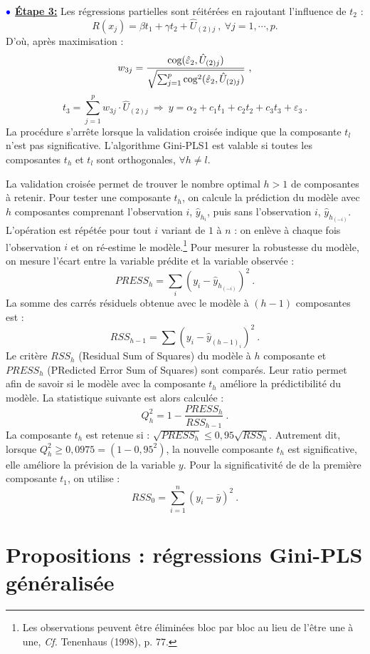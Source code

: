 $\bulle$ \underline{\textbf{Étape 3:}} Les régressions partielles sont réitérées en rajoutant l'influence de $t_2$ :
\[
R(x_j) = \beta t_1 + \gamma t_2 + \hat{U}_{(2)j} \ , \ \forall j = 1,\cdots, p.
\]
D'où, après maximisation :
\[
w_{3j} = \frac{\text{cog}(\hat{\varepsilon}_2,\hat{U}_{(2)j})}{\sqrt{\sum_{j=1}^p \text{cog}^2(\hat{\varepsilon}_2,\hat{U}_{(2)j})}} \ ,
\]
\[
t_3 = \sum_{j=1}^p w_{3j}\cdot \hat{U}_{(2)j} \ \Longrightarrow \ y = \alpha_2 + c_1 t_1 + c_2 t_2 + c_3 t_3 + \varepsilon_3 \ .
\]
La procédure s'arrête lorsque la validation croisée indique que la composante $t_l$ n'est pas significative. L'algorithme Gini-PLS1 est valable si toutes les composantes $t_h$ et $t_l$ sont orthogonales, $\forall h\neq l$. 

\medskip

La validation croisée permet de trouver le nombre optimal $h>1$ de composantes à retenir. Pour tester une composante $t_h$, on calcule la prédiction du modèle avec $h$ composantes comprenant l'observation $i$, $\hat{y}_{h_i}$, puis sans l'observation $i$, $\hat{y}_{h_{(-i)}}$. L'opération est répétée pour tout $i$ variant de $1$ à $n$ : on enlève à chaque fois l'observation $i$ et on ré-estime le modèle.\footnote{Les observations peuvent être éliminées bloc par bloc au lieu de l'être une à une, \emph{Cf.} Tenenhaus (1998), p. 77.} Pour mesurer la robustesse du modèle, on mesure l'écart entre la variable prédite et la variable observée :
\[
PRESS_h =  \sum_i\left(y_i - \hat{y}_{h_{(-i)}}\right)^2 \ .
\]
La somme des carrés résiduels obtenue avec le modèle à $(h-1)$ composantes est : 
\[
RSS_{h-1} = \sum \left(y_i - \hat{y}_{(h-1)_i}\right)^2 \ .
\]
Le critère $RSS_h$ (Residual Sum of Squares) du modèle à $h$ composante et $PRESS_h$ (PRedicted Error Sum of Squares) sont comparés. Leur ratio permet afin de savoir si le modèle avec la composante $t_h$ améliore la prédictibilité du modèle. La statistique suivante est alors calculée :
\[
Q^2_h =1 - \frac{PRESS_h}{RSS_{h-1}} \ .
\]
La composante $t_h$ est retenue si : $\sqrt{PRESS_h} \leq 0,95 \sqrt{RSS_h}$. Autrement dit, lorsque $Q^2_h \geq 0,0975 = (1 - 0,95^2)$, la nouvelle composante $t_h$ est significative, elle améliore la prévision de la variable $y$. Pour la significativité de de la première composante $t_1$,  on utilise :
\[
RSS_0 = \sum^{n}_{i = 1} \left(y_i - \bar{y}\right)^2  \ .
\]


\section{Propositions : régressions Gini-PLS généralisée} 

